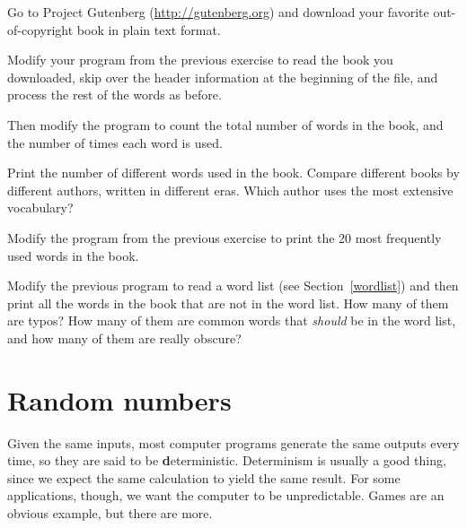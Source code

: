 \documentclass[
DIV=11,
fontsize=12,
twoside,
headinclude=false,
titlepage=firstiscover,
abstract=true,
headsepline=true,
footsepline=true,
chapterprefix=true, %
headings=big,
bibliography=totoc,%
captions=tableheading
]{scrbook}
\theoremstyle{definition}
\begin{document}
\begin{exercise}
\normalfont
{}

Go to Project Gutenberg (\url{http://gutenberg.org}) and download 
your favorite out-of-copyright book in plain text format.

Modify your program from the previous exercise to read the book
you downloaded, skip over the header information at the beginning
of the file, and process the rest of the words as before.

Then modify the program to count the total number of words in
the book, and the number of times each word is used.

Print the number of different words used in the book.  Compare
different books by different authors, written in different eras.
Which author uses the most extensive vocabulary?
\end{exercise}


\begin{exercise}
\normalfont

Modify the program from the previous exercise to print the
20 most frequently used words in the book.

\end{exercise}


\begin{exercise}
\normalfont

Modify the previous program to read a word list (see
Section~\ref{wordlist}) and then print all the words in the book that
are not in the word list.  How many of them are typos?  How many of
them are common words that {\em should} be in the word list, and how
many of them are really obscure?

\end{exercise}


\section{Random numbers}

Given the same inputs, most computer programs generate the same
outputs every time, so they are said to be {\textbf deterministic}.
Determinism is usually a good thing, since we expect the same
calculation to yield the same result.  For some applications, though,
we want the computer to be unpredictable.  Games are an obvious
example, but there are more.
\end{document}
